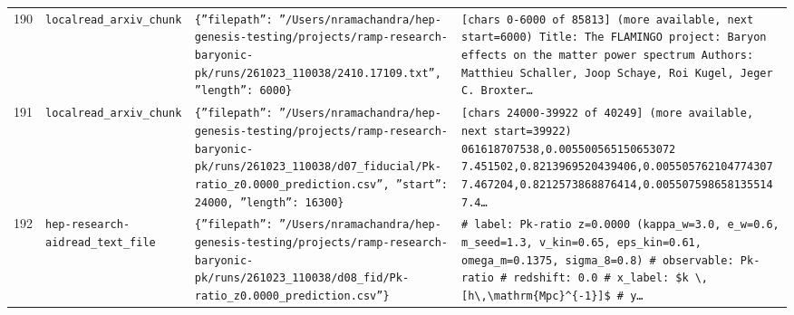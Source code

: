 \documentclass[11pt,a4paper]{article}
\begin{document}
\begin{longtable}{@{}p{}p{}p{}p{}@{}}
190 & \texttt{local}\newline\texttt{read\_\allowbreak{}arxiv\_\allowbreak{}chunk} & \texttt{\{''filepath'':\allowbreak{} ''/\allowbreak{}Users/\allowbreak{}nramachandra/\allowbreak{}hep-genesis-testing/\allowbreak{}projects/\allowbreak{}ramp-research-baryonic-pk/\allowbreak{}runs/\allowbreak{}261023\_\allowbreak{}110038/\allowbreak{}2410.17109.txt'',\allowbreak{} ''length'':\allowbreak{} 6000\}\allowbreak{}} & \texttt{[chars 0-6000 of 85813]\allowbreak{} (more available,\allowbreak{} next start=\allowbreak{}6000)\allowbreak{}  Title:\allowbreak{} The FLAMINGO project:\allowbreak{} Baryon effects on the matter power spectrum Authors:\allowbreak{} Matthieu Schaller,\allowbreak{} Joop Schaye,\allowbreak{} Roi Kugel,\allowbreak{} Jeger C. Broxter\ldots{}\allowbreak{}} \\
191 & \texttt{local}\newline\texttt{read\_\allowbreak{}arxiv\_\allowbreak{}chunk} & \texttt{\{''filepath'':\allowbreak{} ''/\allowbreak{}Users/\allowbreak{}nramachandra/\allowbreak{}hep-genesis-testing/\allowbreak{}projects/\allowbreak{}ramp-research-baryonic-pk/\allowbreak{}runs/\allowbreak{}261023\_\allowbreak{}110038/\allowbreak{}d07\_\allowbreak{}fiducial/\allowbreak{}Pk-ratio\_\allowbreak{}z0.0000\_\allowbreak{}prediction.csv'',\allowbreak{} ''start'':\allowbreak{} 24000,\allowbreak{} ''length'':\allowbreak{} 16300\}\allowbreak{}} & \texttt{[chars 24000-39922 of 40249]\allowbreak{} (more available,\allowbreak{} next start=\allowbreak{}39922)\allowbreak{}  061618707538,\allowbreak{}0.005500565150653072 7.451502,\allowbreak{}0.8213969520439406,\allowbreak{}0.005505762104774307 7.467204,\allowbreak{}0.8212573868876414,\allowbreak{}0.005507598658135514 7.4\ldots{}\allowbreak{}} \\
192 & \texttt{hep-research-aid}\newline\texttt{read\_\allowbreak{}text\_\allowbreak{}file} & \texttt{\{''filepath'':\allowbreak{} ''/\allowbreak{}Users/\allowbreak{}nramachandra/\allowbreak{}hep-genesis-testing/\allowbreak{}projects/\allowbreak{}ramp-research-baryonic-pk/\allowbreak{}runs/\allowbreak{}261023\_\allowbreak{}110038/\allowbreak{}d08\_\allowbreak{}fid/\allowbreak{}Pk-ratio\_\allowbreak{}z0.0000\_\allowbreak{}prediction.csv''\}\allowbreak{}} & \texttt{\# label:\allowbreak{} Pk-ratio z=\allowbreak{}0.0000 (kappa\_\allowbreak{}w=\allowbreak{}3.0,\allowbreak{} e\_\allowbreak{}w=\allowbreak{}0.6,\allowbreak{} m\_\allowbreak{}seed=\allowbreak{}1.3,\allowbreak{} v\_\allowbreak{}kin=\allowbreak{}0.65,\allowbreak{} eps\_\allowbreak{}kin=\allowbreak{}0.61,\allowbreak{} omega\_\allowbreak{}m=\allowbreak{}0.1375,\allowbreak{} sigma\_\allowbreak{}8=\allowbreak{}0.8)\allowbreak{} \# observable:\allowbreak{} Pk-ratio \# redshift:\allowbreak{} 0.0 \# x\_\allowbreak{}label:\allowbreak{} \$k \textbackslash{}\allowbreak{},\allowbreak{} [h\textbackslash{}\allowbreak{},\allowbreak{}\textbackslash{}\allowbreak{}mathrm\{Mpc\}\allowbreak{}\textasciicircum{}\allowbreak{}\{-1\}\allowbreak{}]\allowbreak{}\$ \# y\ldots{}\allowbreak{}} \\

\end{longtable}
\end{document}

